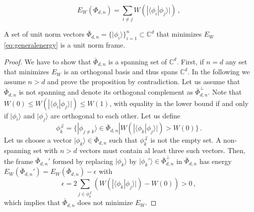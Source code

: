 \documentclass[10pt,a4paper]{amsart}
\begin{document}
\begin{equation}
    E_W(\Phi_{d, n}) = \sum_{i \neq j} W\left(|\langle\phi_i  |\phi_j \rangle|\right) \,,
    \label{eq:generalenergy}
\end{equation}

\begin{proposition}\label{prop:MOF}
    A set of unit norm vectors $\bar \Phi_{d, n} = \{ |\phi_i\rangle \}_{i=1}^{n} \subset \mathbb C^d$ that minimizes $E_W$ \eqref{eq:generalenergy} is a unit norm frame.
\end{proposition}

\begin{proof}
    We have to show that $\bar \Phi_{d, n}$ is a spanning set of $\mathbb C^d$. First, if $n=d$ any set that minimizes $E_W$ is an orthogonal basis and thus spans $\mathbb C^d$. In the following we assume $n > d$ and prove the proposition by contradiction. Let us assume that $\bar \Phi_{d, n}$ is not spanning and denote its orthogonal complement as $\bar \Phi_{d, n}^\perp$.
    Note that $W(0) \leq W\left(|\langle\phi_i  |\phi_j \rangle|\right) \leq W(1)$, with equality in the lower bound if and only if $| \phi_i \rangle$ and $| \phi_j \rangle$ are orthogonal to each other. Let us define
    \begin{equation}
        \phi_k^{\not \perp} = \{|\phi_{j \neq k}\rangle \in \bar \Phi_{d, n} | W\left(|\langle\phi_k |\phi_j \rangle|\right) > W(0) \} \,.
    \end{equation}
    Let us choose a vector $|\phi_k\rangle \in \bar \Phi_{d, n}$ such that $\phi_k^{\not \perp}$ is not the empty set. A non-spanning set with $n > d$ vectors must contain al least three such vectors. Then, the frame $\bar \Phi_{d, n}'$ formed by replacing $|\phi_k\rangle$ by $|\phi_k'\rangle \in \bar \Phi_{d, n}^\perp$ in $\bar \Phi_{d, n}$ has energy $E_W(\bar \Phi_{d, n}') = E_W(\bar \Phi_{d, n}) - \epsilon$ with
    \begin{equation}
        \epsilon = 2\sum_{j \in \phi_k^{\not \perp}} \left(  W\left(|\langle\phi_k  |\phi_j \rangle|\right) - W(0) \right) > 0\,,
    \end{equation}
    which implies that $\bar \Phi_{d, n}$ does not minimize $E_W$.
\end{proof}
\end{document}
